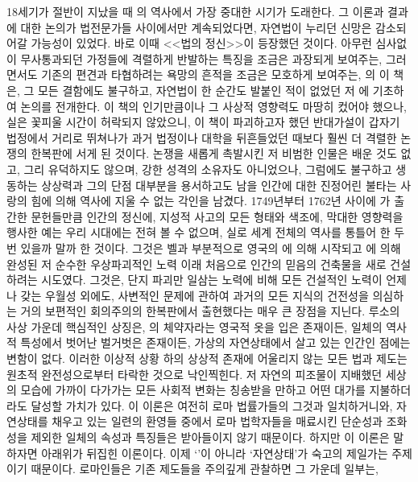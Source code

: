 18세기가 절반이 지났을 때 의 역사에서 가장 중대한 시기가 도래한다.
그 이론과 결과에 대한 논의가 법전문가들 사이에서만 계속되었다면,
자연법이 누리던 신망은 감소되어갈 가능성이 있었다.
바로 이때 <<법의 정신>>이 등장했던 것이다.
아무런 심사없이 무사통과되던 가정들에 격렬하게 반발하는
특징을 조금은 과장되게 보여주는,
그러면서도 기존의 편견과 타협하려는 욕망의 흔적을
조금은 모호하게 보여주는,
의 이 책은,
그 모든 결함에도 불구하고,
자연법이 한 순간도 발붙인 적이 없었던 저 에
기초하여 논의를 전개한다.
이 책의 인기만큼이나 그 사상적 영향력도 마땅히 컸어야 했으나,
실은 꽃피울 시간이 허락되지 않았으니,
이 책이 파괴하고자 했던 반대가설이 갑자기 법정에서 거리로 뛰쳐나가
과거 법정이나 대학을 뒤흔들었던 때보다 훨씬 더 격렬한 논쟁의
한복판에 서게 된 것이다.
논쟁을 새롭게 촉발시킨 저 비범한 인물은
배운 것도 없고, 그리 유덕하지도 않으며, 강한 성격의 소유자도 아니었으나,
그럼에도 불구하고 생동하는 상상력과
그의 단점 대부분을 용서하고도 남을
인간에 대한 진정어린 불타는 사랑의 힘에 의해
역사에 지울 수 없는 각인을 남겼다.
1749년부터 1762년 사이에 가 출간한 문헌들만큼
인간의 정신에, 지성적 사고의 모든 형태와 색조에,
막대한 영향력을 행사한 예는
우리 시대에는 전혀 볼 수 없으며, 실로 세계 전체의 역사를 통틀어 한 두 번
있을까 말까 한 것이다.
그것은 벨과
부분적으로 영국의 에 의해
시작되고 에 의해 완성된 저 순수한 우상파괴적인 노력 이래
처음으로 인간의 믿음의 건축물을 새로 건설하려는 시도였다.
그것은, 단지 파괴만 일삼는 노력에 비해 모든 건설적인 노력이
언제나 갖는 우월성 외에도,
사변적인 문제에 관하여 과거의 모든 지식의 건전성을 의심하는
거의 보편적인 회의주의의 한복판에서 출현했다는 매우 큰 장점을 지닌다.
루소의 사상 가운데 핵심적인 상징은,
의 체약자라는 영국적 옷을 입은 존재이든,
일체의 역사적 특성에서 벗어난 벌거벗은 존재이든,
가상의 자연상태에서 살고 있는 인간인 점에는 변함이 없다.
이러한 이상적 상황 하의 상상적 존재에 어울리지 않는
모든 법과 제도는 원초적 완전성으로부터 타락한 것으로 낙인찍힌다.
저 자연의 피조물이 지배했던 세상의 모습에 가까이 다가가는 모든 사회적 변화는
칭송받을 만하고 어떤 대가를 지불하더라도 달성할 가치가 있다.
이 이론은 여전히 로마 법률가들의 그것과 일치하거니와,
자연상태를 채우고 있는 일련의 환영들 중에서
로마 법학자들을 매료시킨 단순성과 조화성을 제외한 일체의
속성과 특징들은 받아들이지 않기 때문이다.
하지만 이 이론은 말하자면 아래위가 뒤집힌 이론이다.
이제 `'이 아니라 `자연상태'가 숙고의 제일가는 주제이기 때문이다.
로마인들은 기존 제도들을 주의깊게 관찰하면 그 가운데 일부는,
